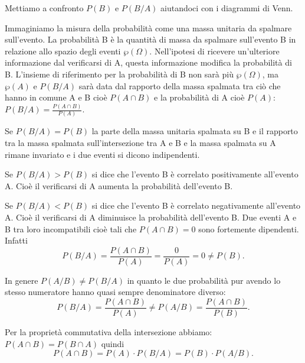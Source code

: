 Mettiamo a confronto $P(B)$ e $P(B/A)$ aiutandoci con i diagrammi di Venn.
\begin{center}
 
\end{center}
Immaginiamo la misura della probabilità come una massa unitaria da spalmare 
sull'evento. La probabilità B è la quantità di massa da spalmare 
sull'evento B 
in relazione allo spazio degli eventi $\wp (\Omega )$. Nell'ipotesi di 
ricevere 
un'ulteriore informazione dal verificarsi di A, questa informazione 
modifica la 
probabilità di B. L'insieme di riferimento per la probabilità di B non sarà 
più 
$\wp (\Omega )$, ma $\wp (A)$ e $P(B/A)$ sarà data dal rapporto della massa 
spalmata tra ciò che hanno in comune A e B cioè $P(A\cap B)$ e la 
probabilità 
di 
A cioè $P(A)$: $P(B/A)=\frac{P(A\cap B)}{P(A)}$.

Se $P(B/A)=P(B)$ la parte della massa unitaria spalmata su B e il rapporto 
tra 
la massa spalmata sull'intersezione tra A e B e la massa spalmata su A 
rimane 
invariato e i due eventi si dicono indipendenti.

Se $P(B/A)>P(B)$ si dice che l'evento B è correlato positivamente 
all'evento A. 
Cioè il verificarsi di A aumenta la probabilità dell'evento B.

Se $P(B/A)<P(B)$ si dice che l'evento B è correlato negativamente 
all'evento A. 
Cioè il verificarsi di A diminuisce la probabilità dell'evento B.
\osservazione Due eventi A e B tra loro incompatibili cioè tali che 
$P(A\cap 
B)=0$ sono fortemente dipendenti. Infatti 
\[P(B/A)=\frac{P(A\cap B)}{P(A)}=\frac 0{P(A)}=0\neq P(B).\]

In genere $ P(A/B)\neq P(B/A) $ in quanto le due probabilità pur avendo lo 
stesso numeratore hanno quasi sempre denominatore diverso: 
\[P(B/A)=\frac{P(A\cap B)}{P(A)}\neq P(A/B)=\frac{P(A\cap B)}{P(B)}.\]

Per la proprietà commutativa della intersezione abbiamo: $P(A\cap 
B)=P(B\cap 
A)$ 
quindi 
\[P(A\cap B)=P(A)\cdot P(B/A)=P(B)\cdot P(A/B).\]

